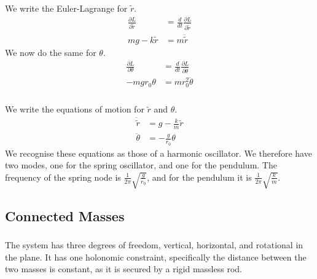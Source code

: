 \documentclass{article}
\begin{document}
\subsubsection{} %

We write the Euler-Lagrange for $\tilde{r}$.
\begin{align*}
	\frac{\partial L}{\partial \tilde{r}} &= \frac{d}{dt}\frac{\partial L}{\partial \dot{\tilde{r}}}\\
	mg - k\tilde{r} &= m\ddot{\tilde{r}}
\end{align*}
We now do the same for $\theta$.
\begin{align*}
	\frac{\partial L}{\partial \theta} &= \frac{d}{dt}\frac{\partial L}{\partial \dot{\theta}}\\
	-mgr_0\theta &= mr_0^2\ddot{\theta}
\end{align*}
\subsubsection{} %

We write the equations of motion for $\tilde{r}$ and $\theta$.
\begin{align*}
	\ddot{\tilde{r}} &= g - \frac{k}{m}\tilde{r}\\
	\ddot{\theta} &= -\frac{g}{r_0}\theta
\end{align*}
We recognise these equations as those of a harmonic oscillator. We therefore have two modes, one for the spring oscillator, and one for the pendulum. The frequency of the spring node is $\frac{1}{2\pi}\sqrt{\frac{g}{r_0}}$, and for the pendulum it is $\frac{1}{2\pi}\sqrt{\frac{k}{m}}$.

\subsection{Connected Masses}

\subsubsection{} %

The system has three degrees of freedom, vertical, horizontal, and rotational in the plane. It has one holonomic constraint, specifically the distance between the two masses is constant, as it is secured by a rigid massless rod.

\subsubsection{} %



\subsubsection{} %



\subsubsection{} %
\end{document}
